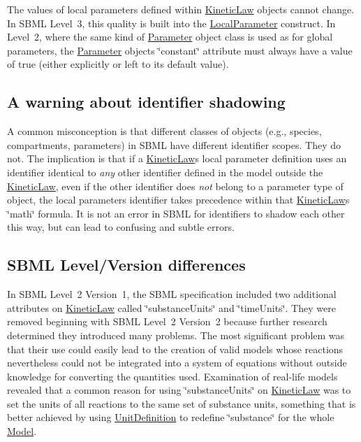 The values of local parameters defined within \hyperlink{class_kinetic_law}{Kinetic\+Law} objects cannot change. In S\+B\+ML Level~3, this quality is built into the \hyperlink{class_local_parameter}{Local\+Parameter} construct. In Level~2, where the same kind of \hyperlink{class_parameter}{Parameter} object class is used as for global parameters, the \hyperlink{class_parameter}{Parameter} objects\textquotesingle{} \char`\"{}constant\char`\"{} attribute must always have a value of {\ttfamily true} (either explicitly or left to its default value).\hypertarget{class_kinetic_law_shadowing-warning}{}\subsection{A warning about identifier shadowing}\label{class_kinetic_law_shadowing-warning}
A common misconception is that different classes of objects (e.\+g., species, compartments, parameters) in S\+B\+ML have different identifier scopes. They do not. The implication is that if a \hyperlink{class_kinetic_law}{Kinetic\+Law}\textquotesingle{}s local parameter definition uses an identifier identical to {\itshape any} other identifier defined in the model outside the \hyperlink{class_kinetic_law}{Kinetic\+Law}, even if the other identifier does {\itshape not} belong to a parameter type of object, the local parameter\textquotesingle{}s identifier takes precedence within that \hyperlink{class_kinetic_law}{Kinetic\+Law}\textquotesingle{}s \char`\"{}math\char`\"{} formula. It is not an error in S\+B\+ML for identifiers to shadow each other this way, but can lead to confusing and subtle errors.\hypertarget{class_kinetic_law_version-diffs}{}\subsection{S\+B\+M\+L Level/\+Version differences}\label{class_kinetic_law_version-diffs}
In S\+B\+ML Level~2 Version~1, the S\+B\+ML specification included two additional attributes on \hyperlink{class_kinetic_law}{Kinetic\+Law} called \char`\"{}substance\+Units\char`\"{} and \char`\"{}time\+Units\char`\"{}. They were removed beginning with S\+B\+ML Level~2 Version~2 because further research determined they introduced many problems. The most significant problem was that their use could easily lead to the creation of valid models whose reactions nevertheless could not be integrated into a system of equations without outside knowledge for converting the quantities used. Examination of real-\/life models revealed that a common reason for using \char`\"{}substance\+Units\char`\"{} on \hyperlink{class_kinetic_law}{Kinetic\+Law} was to set the units of all reactions to the same set of substance units, something that is better achieved by using \hyperlink{class_unit_definition}{Unit\+Definition} to redefine {\ttfamily \char`\"{}substance\char`\"{}} for the whole \hyperlink{class_model}{Model}.


